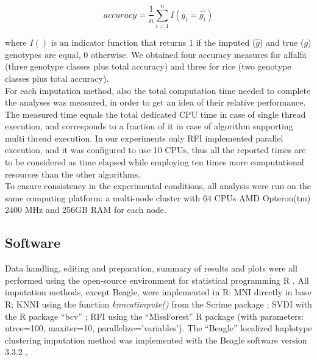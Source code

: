 \begin{equation}
\label{eq:accuracy}
accuracy = \frac{1}{n} \sum_{i=1}^{n}{I(g_i = \hat{g_i})}
\end{equation}

where $I()$ is an indicator function that returns 1 if the imputed ($\hat{g}$) and true ($g$) genotypes are equal, 0 otherwise. We obtained four accuracy measures for alfalfa (three genotype classes plus total accuracy) and three for rice (two genotype classes plus total accuracy).\\
For each imputation method, also the total computation time needed to complete the analyses was measured, in order to get an idea of their relative performance. The measured time equals the total dedicated CPU time in case of single thread execution, and corresponds to a fraction of it in case of algorithm supporting multi thread execution. In our experiments only RFI implemented parallel execution, and it was configured to use 10 CPUs, thus all the reported times are to be considered as time elapsed while employing ten times more computational resources than the other algorithms.\\
To ensure consistency in the experimental conditions, all analysis were run on the same computing platform: a multi-node cluster with 64 CPUs AMD Opteron(tm) 2400 MHz and 256GB RAM for each node.
 
\subsection{Software}
\label{sec:software}
Data handling, editing and preparation, summary of results and plots were all performed using the open-source environment for statistical programming R \cite{r_core_team_r:_2014}. All imputation methods, except Beagle, were implemented in R: MNI directly in base R; KNNI using the function \emph{knncatimpute()} from the Scrime package \cite{schwender_scrime:_2013}; SVDI with the R package ``bcv'' \cite{perry_bcv:_2009}; RFI using the ``MissForest'' \cite{stekhoven_missforestnon-parametric_2012} R package (with parameters: ntree=100, maxiter=10, parallelize='variables'). The ``Beagle'' localized haplotype clustering imputation method was implemented with the Beagle software version 3.3.2 \cite{browning_rapid_2007}.
